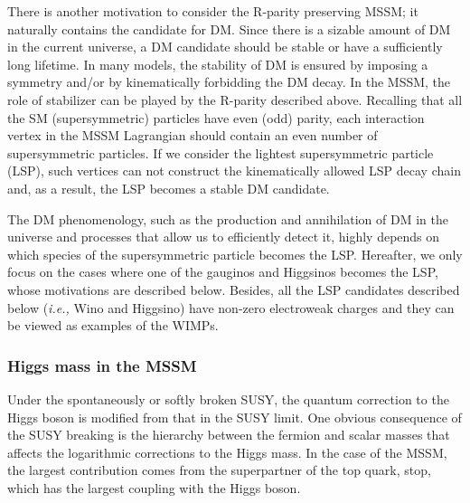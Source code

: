 \documentclass[12pt,twoside,book]{article}
\begin{document}
There is another motivation to consider the R-parity preserving MSSM; it naturally contains the candidate for DM.
Since there is a sizable amount of DM in the current universe, a DM candidate should be stable or have a sufficiently long lifetime.
In many models, the stability of DM is ensured by imposing a symmetry and/or by kinematically forbidding the DM decay.
In the MSSM, the role of stabilizer can be played by the R-parity described above.
Recalling that all the SM (supersymmetric) particles have even (odd) parity, each interaction vertex in the MSSM Lagrangian should contain an even number of supersymmetric particles.
If we consider the lightest supersymmetric particle (LSP), such vertices can not construct the kinematically allowed LSP decay chain and, as a result, the LSP becomes a stable DM candidate.

The DM phenomenology, such as the production and annihilation of DM in the universe and processes that allow us to efficiently detect it, highly depends on which species of the supersymmetric particle becomes the LSP.
Hereafter, we only focus on the cases where one of the gauginos and Higgsinos becomes the LSP, whose motivations are described below.
Besides, all the LSP candidates described below (\textit{i.e.,} Wino and Higgsino) have non-zero electroweak charges and they can be viewed as examples of the WIMPs.


\subsubsection*{Higgs mass in the MSSM}

Under the spontaneously or softly broken SUSY, the quantum correction to the Higgs boson is modified from that in the SUSY limit.
One obvious consequence of the SUSY breaking is the hierarchy between the fermion and scalar masses that affects the logarithmic corrections to the Higgs mass.
In the case of the MSSM, the largest contribution comes from the superpartner of the top quark, stop, which has the largest coupling with the Higgs boson.
\end{document}
